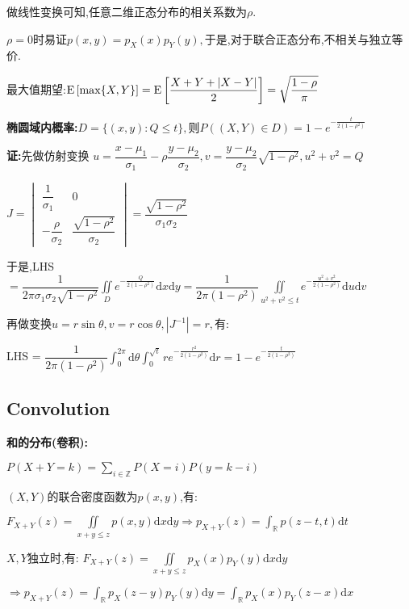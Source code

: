 \begin{enumerate}
    做线性变换可知,任意二维正态分布的相关系数为$ \rho$.

    $ \rho = 0$时易证$ p(x,y) = p_X(x)p_Y(y),$于是,对于联合正态分布,不相关与独立等价.

    最大值期望:$ \text{E}\left[\max\{ X,Y\}\right] = \text{E}\left[\dfrac{X+Y+|X-Y|}{2}\right] = \sqrt{\dfrac{1-\rho}{\pi}} $

    \textbf{椭圆域内概率:}$ D=\{(x,y): Q \le t \}, 则P((X,Y)\in D) = 1-e^{-\frac{t}{2(1-\rho^2)}}$

    \textbf{证:}先做仿射变换 $ u = \dfrac{x-\mu_1}{\sigma_1}-\rho\dfrac{y-\mu_2}{\sigma_2}, v = \dfrac{y-\mu_2}{\sigma_2}\sqrt{1-\rho^2}, u^2+v^2=Q$

    $ J= \begin{vmatrix} \dfrac{1}{\sigma_1} & 0 \\ -\dfrac{\rho}{\sigma_2} & \dfrac{\sqrt{1-\rho^2}}{\sigma_2} \end{vmatrix} = \dfrac{\sqrt{1-\rho^2}}{\sigma_1\sigma_2}$

    于是,LHS$ =\dfrac{1}{2\pi\sigma_1\sigma_2\sqrt{1-\rho^2}}\iint\limits_{D}e^{-\frac{Q}{2(1-\rho^2)}}\mathrm{d}x\mathrm{d}y = \dfrac{1}{2\pi(1-\rho^2)}\iint\limits_{u^2+v^2\le t}e^{-\frac{u^2+v^2}{2(1-\rho^2)}}\mathrm{d}u\mathrm{d}v$

    再做变换$ u = r\sin\theta, v=r\cos\theta, |J^{-1}| = r,有:$

    LHS = $\dfrac{1}{2\pi(1-\rho^2)}\int_{0}^{2\pi}{\mathrm{d}\theta}\int_{0}^{\sqrt{t}}{re^{-\frac{r^2}{2(1-\rho^2)}}\mathrm{d}r}  = 1-e^{-\frac{t}{2(1-\rho^2)}}$

\end{enumerate}

\subsection{Convolution}
\textbf{和的分布(卷积):}

$P(X+Y=k) = \sum_{i\in \mathbb{Z}}{P(X=i)P(y=k-i)}$

$(X,Y)$的联合密度函数为$ p(x,y)$,有:

$F_{X+Y}(z) = \iint\limits_{x+y\le z}p(x,y)\mathrm{d}x\mathrm{d}y \Rightarrow p_{X+Y}(z)=\int_{\mathbb{R}}p(z-t,t)\mathrm{d}t$

$X,Y$独立时,有: $F_{X+Y}(z) = \iint\limits_{x+y\le z}p_X(x)p_Y(y)\mathrm{d}x\mathrm{d}y $

$\Rightarrow p_{X+Y}(z)= \int_{\mathbb{R}}p_X(z-y)p_Y(y)\mathrm{d}y=\int_{\mathbb{R}}{p_X(x)p_Y(z-x)\mathrm{d}x}$

